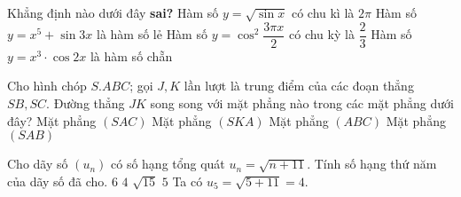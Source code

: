 \begin{ex}%
	Khẳng định nào dưới đây \textbf{sai?}
	\choice
	{Hàm số $y=\sqrt{\sin x}$ có chu kì là $2\pi$}
	{Hàm số $y=x^5+\sin 3x$ là hàm số lẻ}
	{Hàm số $y=\cos^2{\dfrac{3\pi x}{2}}$ có chu kỳ là $\dfrac{2}{3}$}
	{\True Hàm số $y=x^3 \cdot \cos 2x$ là hàm số chẵn}
\end{ex}

\begin{ex}%
	Cho hình chóp $S.ABC$; gọi $J,K$ lần lượt là trung điểm của các đoạn thẳng $SB,SC$. Đường thẳng $JK$ song song với mặt phẳng nào trong các mặt phẳng dưới đây?
	\choice
	{Mặt phẳng $(SAC)$}
	{Mặt phẳng $(SKA)$}
	{\True Mặt phẳng $(ABC)$}
	{Mặt phẳng $(SAB)$}
\end{ex}

\begin{ex}%
	Cho dãy số $(u_n)$ có số hạng tổng quát $u_n=\sqrt{n+11}$. Tính số hạng thứ năm của dãy số đã cho.
	\choice
	{$6$}
	{\True $4$}
	{$\sqrt{15}$}
	{$5$}
	\loigiai
	{
		Ta có $u_5=\sqrt{5+11}=4$.
	}
\end{ex}

